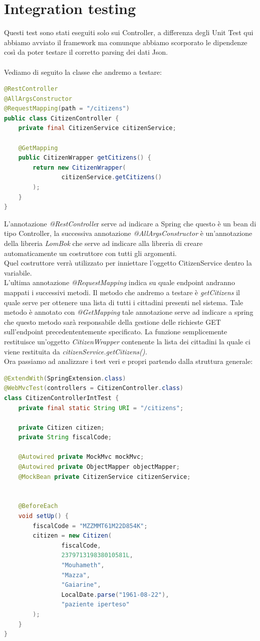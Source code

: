 \documentclass[a4paper,12pt,openany,oneside]{book}
\begin{document}
\section{Integration testing}
Questi test sono stati eseguiti solo sui Controller, a differenza degli Unit Test qui abbiamo avviato il framework ma comunque abbiamo scorporato le dipendenze così da poter testare il corretto parsing dei dati Json.\\\\
Vediamo di seguito la classe che andremo a testare:
\begin{lstlisting}[language=Java]
@RestController
@AllArgsConstructor
@RequestMapping(path = "/citizens")
public class CitizenController {
    private final CitizenService citizenService;

    @GetMapping
    public CitizenWrapper getCitizens() {
        return new CitizenWrapper(
                citizenService.getCitizens()
        );
    }
}
\end{lstlisting}
L'annotazione \textit{@RestControlle}r serve ad indicare a Spring che questo è un bean di tipo Controller, la successiva annotazione \textit{@AllArgsConstructor} è un'annotazione della libreria \textit{LomBok} che serve ad indicare alla libreria di creare automaticamente un costruttore con tutti gli argomenti.\\Quel costruttore verrà utilizzato per inniettare l'oggetto CitizenService dentro la variabile.\\L'ultima annotazione \textit{@RequestMapping} indica su quale endpoint andranno mappati i successivi metodi. Il metodo che andremo a testare è \textit{getCitizens} il quale serve per ottenere una lista di tutti i cittadini presenti nel sistema. Tale metodo è annotato con \textit{@GetMapping} tale annotazione serve ad indicare a spring che questo metodo sarà responsabile della gestione delle richieste GET sull'endpoint precedententemente specificato. La funzione semplicemente restituisce un'oggetto \textit{CitizenWrapper} contenente la lista dei cittadini la quale ci viene restituita da \textit{citizenService.getCitizens().}\\
\newpage
\noindent Ora passiamo ad analizzare i test veri e propri partendo dalla struttura generale:
\begin{lstlisting}[language=Java]
@ExtendWith(SpringExtension.class)
@WebMvcTest(controllers = CitizenController.class)
class CitizenControllerIntTest {
    private final static String URI = "/citizens";

    private Citizen citizen;
    private String fiscalCode;

    @Autowired private MockMvc mockMvc;
    @Autowired private ObjectMapper objectMapper;
    @MockBean private CitizenService citizenService;


    @BeforeEach
    void setUp() {
        fiscalCode = "MZZMMT61M22D854K";
        citizen = new Citizen(
                fiscalCode,
                237971319838010581L,
                "Mouhameth",
                "Mazza",
                "Gaiarine",
                LocalDate.parse("1961-08-22"),
                "paziente iperteso"
        );
    }
}
\end{lstlisting}
\end{document}
